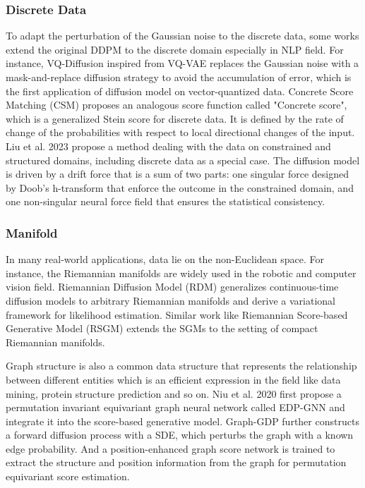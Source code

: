 \documentclass[12pt,DIV14,BCOR12mm,a4paper,footinclude=false,headinclude,parskip=half-,twoside,openright,cleardoublepage=empty,toc=index,bibliography=totoc,listof=totoc]{scrreprt}
\numberwithin{equation}{chapter}
\begin{document}
\subsubsection{Discrete Data}
To adapt the perturbation of the Gaussian noise to the discrete data, some works extend the original DDPM to the discrete domain especially in NLP field. For instance, VQ-Diffusion \cite{gu2022vector} inspired from VQ-VAE \cite{oord2018neural} replaces the Gaussian noise with a mask-and-replace diffusion strategy to avoid the accumulation of error, which is the first application of diffusion model on vector-quantized data. Concrete Score Matching (CSM) \cite{meng2023distillation} proposes an analogous score function called "Concrete score", which is a generalized Stein score for discrete data. It is defined by the rate of change of the probabilities with respect to local directional changes of the input. Liu et al. 2023 \cite{liu2023learning} propose a method dealing with the data on constrained and structured domains, including discrete data as a special case. The diffusion model is driven by a drift force that is a sum of two parts: one singular force designed by Doob's h-transform that enforce the outcome in the constrained domain, and one non-singular neural force field that ensures the statistical consistency.
\subsubsection{Manifold}
In many real-world applications, data lie on the non-Euclidean space. For instance, the Riemannian manifolds are widely used in the robotic and computer vision field. Riemannian Diffusion Model (RDM) \cite{huang2022riemannian} generalizes continuous-time diffusion models to arbitrary Riemannian manifolds and derive a variational framework for likelihood estimation. Similar work like Riemannian Score-based Generative Model (RSGM) \cite{debortoli2022riemannian} extends the SGMs to the setting of compact Riemannian manifolds.

Graph structure is also a common data structure that represents the relationship between different entities which is an efficient expression in the field like data mining,  protein structure prediction and so on. Niu et al. 2020 \cite{niu2020permutation} first propose a permutation invariant equivariant graph neural network called EDP-GNN and integrate it into the score-based generative model. Graph-GDP \cite{huang2022graphgdp} further constructs a forward diffusion process with a SDE, which perturbs the graph with a known edge probability. And a position-enhanced graph score network is trained to extract the structure and position information from the graph for permutation equivariant score estimation.
\end{document}
